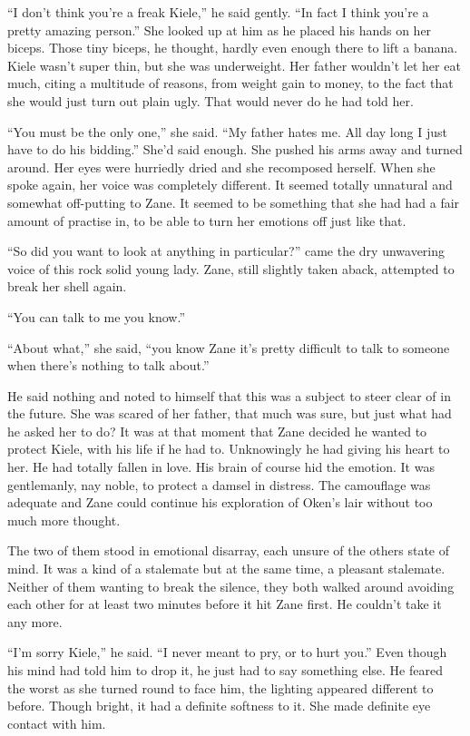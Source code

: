 ``I don't think you're a freak Kiele,'' he said gently.  ``In fact I think you're a pretty amazing person.''  She looked up at him as he placed his hands on her biceps.  Those tiny biceps, he thought, hardly even enough there to lift a banana.  Kiele wasn't super thin, but she was underweight.  Her father wouldn't let her eat much, citing a multitude of reasons, from weight gain to money, to the fact that she would just turn out plain ugly.  That would never do he had told her.

``You must be the only one,'' she said.  ``My father hates me.  All day long I just have to do his bidding.''  She'd said enough.  She pushed his arms away and turned around.  Her eyes were hurriedly dried and she recomposed herself.  When she spoke again, her voice was completely different.  It seemed totally unnatural and somewhat off-putting to Zane.  It seemed to be something that she had had a fair amount of practise in, to be able to turn her emotions off just like that.

``So did you want to look at anything in particular?'' came the dry unwavering voice of this rock solid young lady.  Zane, still slightly taken aback, attempted to break her shell again.

``You can talk to me you know.''

``About what,'' she said, ``you know Zane it's pretty difficult to talk to someone when there's nothing to talk about.''

He said nothing and noted to himself that this was a subject to steer clear of in the future.  She was scared of her father, that much was sure, but just what had he asked her to do?  It was at that moment that Zane decided he wanted to protect Kiele, with his life if he had to.  Unknowingly he had giving his heart to her.  He had totally fallen in love.  His brain of course hid the emotion.  It was gentlemanly, nay noble, to protect a damsel in distress.  The camouflage was adequate and Zane could continue his exploration of Oken's lair without too much more thought.

The two of them stood in emotional disarray, each unsure of the others state of mind.  It was a kind of a stalemate but at the same time, a pleasant stalemate.  Neither of them wanting to break the silence, they both walked around avoiding each other for at least two minutes before it hit Zane first.  He couldn't take it any more.  

``I'm sorry Kiele,'' he said.  ``I never meant to pry, or to hurt you.''  Even though his mind had told him to drop it, he just had to say something else.  He feared the worst as she turned round to face him, the lighting appeared different to before.  Though bright, it had a definite softness to it.  She made definite eye contact with him.

